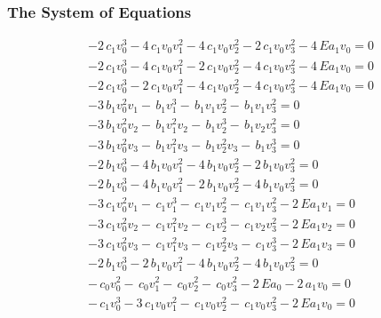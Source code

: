 \documentclass[11pt]{beamer}
\begin{document}
\begin{frame}
\frametitle{The System of Equations}
\fontsize{9}{11}\selectfont
\begin{minipage}{.7\linewidth}
\begin{equation*}
\begin{array}{r}
-2 \, c_{1} v_{0}^{3} - 4 \, c_{1} v_{0} v_{1}^{2} - 4 \, c_{1} v_{0} v_{2}^{2} - 2 \, c_{1} v_{0} v_{3}^{2} - 4 \, E a_{1} v_{0} =0\\
-2 \, c_{1} v_{0}^{3} - 4 \, c_{1} v_{0} v_{1}^{2} - 2 \, c_{1} v_{0} v_{2}^{2} - 4 \, c_{1} v_{0} v_{3}^{2} - 4 \, E a_{1} v_{0} =0\\
-2 \, c_{1} v_{0}^{3} - 2 \, c_{1} v_{0} v_{1}^{2} - 4 \, c_{1} v_{0} v_{2}^{2} - 4 \, c_{1} v_{0} v_{3}^{2} - 4 \, E a_{1} v_{0} =0\\
-3 \, b_{1} v_{0}^{2} v_{1} -  \, b_{1} v_{1}^{3} -  \, b_{1} v_{1} v_{2}^{2} -  \, b_{1} v_{1} v_{3}^{2} =0\\
-3 \, b_{1} v_{0}^{2} v_{2} -  \, b_{1} v_{1}^{2} v_{2} -  \, b_{1} v_{2}^{3} -  \, b_{1} v_{2} v_{3}^{2} =0\\
-3 \, b_{1} v_{0}^{2} v_{3} -  \, b_{1} v_{1}^{2} v_{3} -  \, b_{1} v_{2}^{2} v_{3} -  \, b_{1} v_{3}^{3} =0\\
-2 \, b_{1} v_{0}^{3} - 4 \, b_{1} v_{0} v_{1}^{2} - 4 \, b_{1} v_{0} v_{2}^{2} - 2 \, b_{1} v_{0} v_{3}^{2} =0\\
-2 \, b_{1} v_{0}^{3} - 4 \, b_{1} v_{0} v_{1}^{2} - 2 \, b_{1} v_{0} v_{2}^{2} - 4 \, b_{1} v_{0} v_{3}^{2} =0\\
-3 \, c_{1} v_{0}^{2} v_{1} -  \, c_{1} v_{1}^{3} -  \, c_{1} v_{1} v_{2}^{2} -  \, c_{1} v_{1} v_{3}^{2} - 2 \, E a_{1} v_{1} =0\\
-3 \, c_{1} v_{0}^{2} v_{2} -  \, c_{1} v_{1}^{2} v_{2} -  \, c_{1} v_{2}^{3} -  \, c_{1} v_{2} v_{3}^{2} - 2 \, E a_{1} v_{2} =0\\
-3 \, c_{1} v_{0}^{2} v_{3} -  \, c_{1} v_{1}^{2} v_{3} -  \, c_{1} v_{2}^{2} v_{3} -  \, c_{1} v_{3}^{3} - 2 \, E a_{1} v_{3} =0\\
-2 \, b_{1} v_{0}^{3} - 2 \, b_{1} v_{0} v_{1}^{2} - 4 \, b_{1} v_{0} v_{2}^{2} - 4 \, b_{1} v_{0} v_{3}^{2} =0\\
- \, c_{0} v_{0}^{2} -  \, c_{0} v_{1}^{2} -  \, c_{0} v_{2}^{2} -  \, c_{0} v_{3}^{2} - 2 \, E a_{0} - 2 \, a_{1} v_{0} =0\\
- \, c_{1} v_{0}^{3} - 3 \, c_{1} v_{0} v_{1}^{2} -  \, c_{1} v_{0} v_{2}^{2} -  \, c_{1} v_{0} v_{3}^{2} - 2 \, E a_{1} v_{0} =0\\

\end{array}
\end{equation*}
\end{minipage}
\end{frame}
\end{document}
